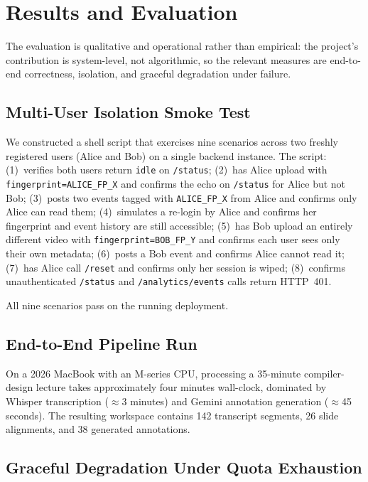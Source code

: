 \documentclass[conference]{IEEEtran}
\begin{document}
\section{Results and Evaluation}\label{sec:eval}

The evaluation is qualitative and operational rather than empirical: the project's contribution is system-level, not algorithmic, so the relevant measures are end-to-end correctness, isolation, and graceful degradation under failure.

\subsection{Multi-User Isolation Smoke Test}

We constructed a shell script that exercises nine scenarios across two freshly registered users (Alice and Bob) on a single backend instance. The script: (1)~verifies both users return \texttt{idle} on \texttt{/status}; (2)~has Alice upload with \texttt{fingerprint=ALICE\_FP\_X} and confirms the echo on \texttt{/status} for Alice but not Bob; (3)~posts two events tagged with \texttt{ALICE\_FP\_X} from Alice and confirms only Alice can read them; (4)~simulates a re-login by Alice and confirms her fingerprint and event history are still accessible; (5)~has Bob upload an entirely different video with \texttt{fingerprint=BOB\_FP\_Y} and confirms each user sees only their own metadata; (6)~posts a Bob event and confirms Alice cannot read it; (7)~has Alice call \texttt{/reset} and confirms only her session is wiped; (8)~confirms unauthenticated \texttt{/status} and \texttt{/analytics/events} calls return HTTP~401.

All nine scenarios pass on the running deployment.

\subsection{End-to-End Pipeline Run}

On a 2026 MacBook with an M-series CPU, processing a 35-minute compiler-design lecture takes approximately four minutes wall-clock, dominated by Whisper transcription ($\approx$3 minutes) and Gemini annotation generation ($\approx$45 seconds). The resulting workspace contains 142 transcript segments, 26 slide alignments, and 38 generated annotations.

\subsection{Graceful Degradation Under Quota Exhaustion}
\end{document}
